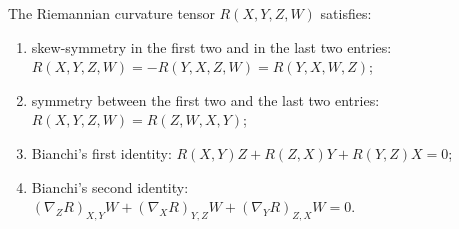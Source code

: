 \begin{proposition}
  \label{prop:pet-ch3-curvature-symmetries}
  \leanok
  The Riemannian curvature tensor $R(X,Y,Z,W)$ satisfies:
  \begin{enumerate}
    \item[(1)] skew-symmetry in the first two and in the last two entries:
    $R(X,Y,Z,W)=-R(Y,X,Z,W)=R(Y,X,W,Z)$;
    \item[(2)] symmetry between the first two and the last two entries:
    $R(X,Y,Z,W)=R(Z,W,X,Y)$;
    \item[(3)] Bianchi's first identity: $R(X,Y)Z+R(Z,X)Y+R(Y,Z)X=0$;
    \item[(4)] Bianchi's second identity:
    $(\nabla_ZR)_{X,Y}W+(\nabla_XR)_{Y,Z}W+(\nabla_YR)_{Z,X}W=0$.
  \end{enumerate}
\end{proposition}

